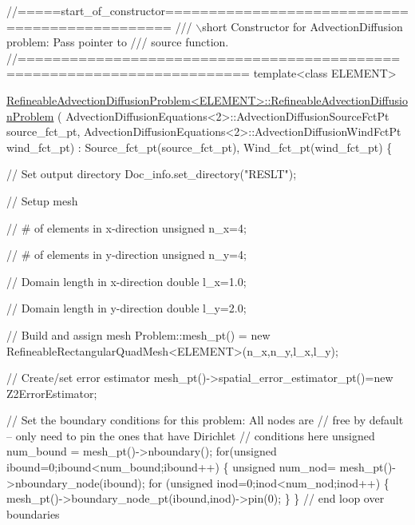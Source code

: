 \begin{DoxyCodeInclude}
\textcolor{comment}{//=====start\_of\_constructor===============================================}
\textcolor{comment}{/// \(\backslash\)short Constructor for AdvectionDiffusion problem: Pass pointer to }
\textcolor{comment}{}\textcolor{comment}{/// source function.}
\textcolor{comment}{}\textcolor{comment}{//========================================================================}
\textcolor{keyword}{template}<\textcolor{keyword}{class} ELEMENT>

      \hyperlink{classRefineableAdvectionDiffusionProblem_a515147bf0907ad339811955edb89817c}{RefineableAdvectionDiffusionProblem<ELEMENT>::RefineableAdvectionDiffusionProblem}
      (
 AdvectionDiffusionEquations<2>::AdvectionDiffusionSourceFctPt source\_fct\_pt,
 AdvectionDiffusionEquations<2>::AdvectionDiffusionWindFctPt wind\_fct\_pt)
       :  Source\_fct\_pt(source\_fct\_pt), Wind\_fct\_pt(wind\_fct\_pt)
\{ 

 \textcolor{comment}{// Set output directory}
 Doc\_info.set\_directory(\textcolor{stringliteral}{"RESLT"});

 \textcolor{comment}{// Setup mesh}

 \textcolor{comment}{// # of elements in x-direction}
 \textcolor{keywordtype}{unsigned} n\_x=4;

 \textcolor{comment}{// # of elements in y-direction}
 \textcolor{keywordtype}{unsigned} n\_y=4;

 \textcolor{comment}{// Domain length in x-direction}
 \textcolor{keywordtype}{double} l\_x=1.0;

 \textcolor{comment}{// Domain length in y-direction}
 \textcolor{keywordtype}{double} l\_y=2.0;

 \textcolor{comment}{// Build and assign mesh}
 Problem::mesh\_pt() = 
  \textcolor{keyword}{new} RefineableRectangularQuadMesh<ELEMENT>(n\_x,n\_y,l\_x,l\_y);

 \textcolor{comment}{// Create/set error estimator}
 mesh\_pt()->spatial\_error\_estimator\_pt()=\textcolor{keyword}{new} Z2ErrorEstimator;
  
 \textcolor{comment}{// Set the boundary conditions for this problem: All nodes are}
 \textcolor{comment}{// free by default -- only need to pin the ones that have Dirichlet }
 \textcolor{comment}{// conditions here}
 \textcolor{keywordtype}{unsigned} num\_bound = mesh\_pt()->nboundary();
 \textcolor{keywordflow}{for}(\textcolor{keywordtype}{unsigned} ibound=0;ibound<num\_bound;ibound++)
  \{
   \textcolor{keywordtype}{unsigned} num\_nod= mesh\_pt()->nboundary\_node(ibound);
   \textcolor{keywordflow}{for} (\textcolor{keywordtype}{unsigned} inod=0;inod<num\_nod;inod++)
    \{
     mesh\_pt()->boundary\_node\_pt(ibound,inod)->pin(0); 
    \}
  \} \textcolor{comment}{// end loop over boundaries}

\end{DoxyCodeInclude}


